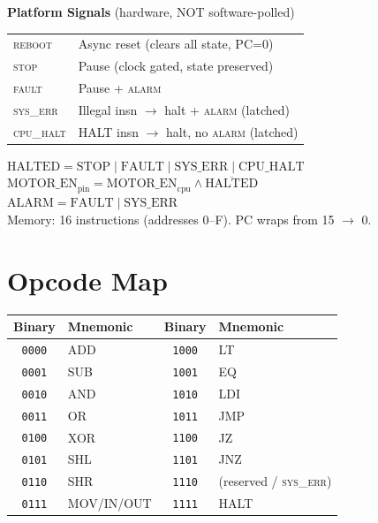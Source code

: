 \documentclass[11pt,a4paper]{article}
\newcommand{\signal}[1]{\textsc{#1}}
\begin{document}
\begin{tcolorbox}[colback=codebg, colframe=ee8blue, title={\large\bfseries EE8 CPU Quick Reference --- Version 4.1}, fonttitle=\color{white}]
\vspace{4pt}
\textbf{Platform Signals} (hardware, NOT software-polled)\\[2pt]
\begin{tabular}{@{}ll@{}}
\signal{reboot}   & Async reset (clears all state, PC=0) \\
\signal{stop}     & Pause (clock gated, state preserved) \\
\signal{fault}    & Pause + \signal{alarm} \\
\signal{sys\_err}  & Illegal insn $\rightarrow$ halt + \signal{alarm} (latched) \\
\signal{cpu\_halt} & HALT insn $\rightarrow$ halt, no \signal{alarm} (latched) \\
\end{tabular}

\vspace{4pt}
$\text{HALTED} = \text{STOP} \mid \text{FAULT} \mid \text{SYS\_ERR} \mid \text{CPU\_HALT}$\\
$\text{MOTOR\_EN}_\text{pin} = \text{MOTOR\_EN}_\text{cpu} \wedge \overline{\text{HALTED}}$\\
$\text{ALARM} = \text{FAULT} \mid \text{SYS\_ERR}$\\[4pt]
Memory: 16 instructions (addresses 0--F). PC wraps from 15 $\rightarrow$ 0.
\end{tcolorbox}

\section{Opcode Map}

\begin{table}[H]
\centering
\begin{tabular}{@{}cl|cl@{}}
\toprule
\textbf{Binary} & \textbf{Mnemonic} & \textbf{Binary} & \textbf{Mnemonic} \\
\midrule
\texttt{0000} & ADD         & \texttt{1000} & LT \\
\texttt{0001} & SUB         & \texttt{1001} & EQ \\
\texttt{0010} & AND         & \texttt{1010} & LDI \\
\texttt{0011} & OR          & \texttt{1011} & JMP \\
\texttt{0100} & XOR         & \texttt{1100} & JZ \\
\texttt{0101} & SHL         & \texttt{1101} & JNZ \\
\texttt{0110} & SHR         & \texttt{1110} & (reserved / \signal{sys\_err}) \\
\texttt{0111} & MOV/IN/OUT  & \texttt{1111} & HALT \\
\bottomrule
\end{tabular}
\end{table}
\end{document}
